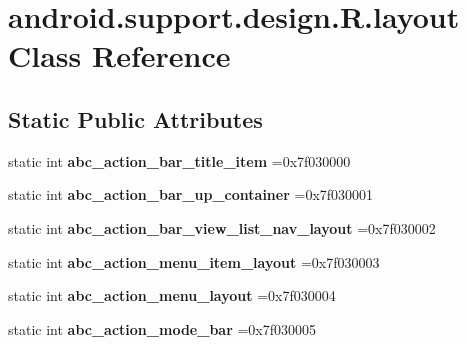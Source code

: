 \hypertarget{classandroid_1_1support_1_1design_1_1R_1_1layout}{}\section{android.\+support.\+design.\+R.\+layout Class Reference}
\label{classandroid_1_1support_1_1design_1_1R_1_1layout}
\subsection*{Static Public Attributes}
\begin{DoxyCompactItemize}
\item 
\mbox{\label{classandroid_1_1support_1_1design_1_1R_1_1layout_a3682d9535019c184745948c6474468a3}} 
static int {\bfseries abc\+\_\+action\+\_\+bar\+\_\+title\+\_\+item} =0x7f030000
\item 
\mbox{\label{classandroid_1_1support_1_1design_1_1R_1_1layout_a6b913b0da7289102981a7804824b6a26}} 
static int {\bfseries abc\+\_\+action\+\_\+bar\+\_\+up\+\_\+container} =0x7f030001
\item 
\mbox{\label{classandroid_1_1support_1_1design_1_1R_1_1layout_ae7212e70ff452747ef77c3a52b198808}} 
static int {\bfseries abc\+\_\+action\+\_\+bar\+\_\+view\+\_\+list\+\_\+nav\+\_\+layout} =0x7f030002
\item 
\mbox{\label{classandroid_1_1support_1_1design_1_1R_1_1layout_ad260195b1f07e66183ed9fb9fec20252}} 
static int {\bfseries abc\+\_\+action\+\_\+menu\+\_\+item\+\_\+layout} =0x7f030003
\item 
\mbox{\label{classandroid_1_1support_1_1design_1_1R_1_1layout_a65cda7f73698e15f0f0de2789b6a3b93}} 
static int {\bfseries abc\+\_\+action\+\_\+menu\+\_\+layout} =0x7f030004
\item 
\mbox{\label{classandroid_1_1support_1_1design_1_1R_1_1layout_abf223310604d034c9f19455e37c4649e}} 
static int {\bfseries abc\+\_\+action\+\_\+mode\+\_\+bar} =0x7f030005

\end{DoxyCompactItemize}
